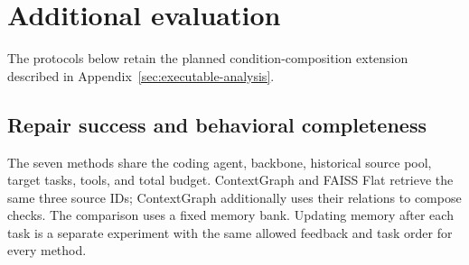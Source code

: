 \section{Additional evaluation}
\label{sec:additional-evaluation}
The protocols below retain the planned condition-composition extension
described in Appendix~\ref{sec:executable-analysis}.

\subsection{Repair success and behavioral completeness}
\label{sec:heldout-main}
The seven methods share the coding agent, backbone, historical source pool,
target tasks, tools, and total budget. ContextGraph and FAISS Flat retrieve
the same three source IDs; ContextGraph additionally uses their relations to
compose checks. The comparison uses a fixed memory bank. Updating memory
after each task is a separate experiment with the same allowed feedback and
task order for every method.

